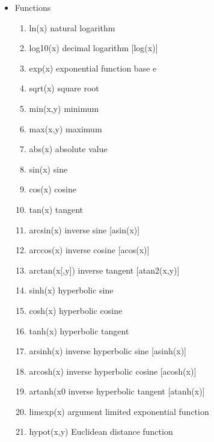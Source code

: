 \begin{itemize}
\item Functions\begin{enumerate}
		\item ln(x)     natural logarithm
		\item log10(x)  decimal logarithm \hspace{2mm} [log(x)]
		\item exp(x)	exponential function base e
		\item sqrt(x)   square root
		\item min(x,y)  minimum
                \item max(x,y)  maximum
		\item abs(x)    absolute value
		\item sin(x)    sine
		\item cos(x)    cosine
		\item tan(x)    tangent
		\item arcsin(x) inverse sine  \hspace{2mm} [asin(x)]
		\item arccos(x) inverse cosine \hspace{2mm} [acos(x)]
		\item arctan(x[,y]) inverse tangent \hspace{2mm} [atan2(x,y)]
		\item sinh(x)   hyperbolic sine
		\item cosh(x)   hyperbolic cosine
		\item tanh(x)   hyperbolic tangent
		\item arsinh(x) inverse hyperbolic sine  \hspace{2mm} [asinh(x)]
		\item arcosh(x) inverse hyperbolic cosine \hspace{2mm} [acosh(x)]
		\item artanh(x0 inverse hyperbolic tangent \hspace{2mm} [atanh(x)]
		\item limexp(x) argument limited exponential function
		\item hypot(x,y) Euclidean distance function
		
               \end{enumerate} 

\end{itemize}



\newpage 


